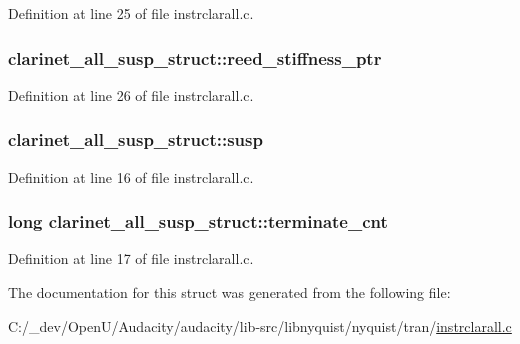 Definition at line 25 of file instrclarall.\+c.

\subsubsection[{\texorpdfstring{reed\+\_\+stiffness\+\_\+ptr}{reed_stiffness_ptr}}]{ clarinet\+\_\+all\+\_\+susp\+\_\+struct\+::reed\+\_\+stiffness\+\_\+ptr}\hypertarget{structclarinet__all__susp__struct_a1ef4f42fbce5563453dbb23e99cbe515}{}\label{structclarinet__all__susp__struct_a1ef4f42fbce5563453dbb23e99cbe515}


Definition at line 26 of file instrclarall.\+c.

\subsubsection[{\texorpdfstring{susp}{susp}}]{ clarinet\+\_\+all\+\_\+susp\+\_\+struct\+::susp}\hypertarget{structclarinet__all__susp__struct_a19306915022f42e71d0c30b49f91cd84}{}\label{structclarinet__all__susp__struct_a19306915022f42e71d0c30b49f91cd84}


Definition at line 16 of file instrclarall.\+c.

\subsubsection[{\texorpdfstring{terminate\+\_\+cnt}{terminate_cnt}}]{\setlength{\rightskip}{0pt plus 5cm}long clarinet\+\_\+all\+\_\+susp\+\_\+struct\+::terminate\+\_\+cnt}\hypertarget{structclarinet__all__susp__struct_a2a86eb694162fff564faee4e32dd2b58}{}\label{structclarinet__all__susp__struct_a2a86eb694162fff564faee4e32dd2b58}


Definition at line 17 of file instrclarall.\+c.



The documentation for this struct was generated from the following file\+:\begin{DoxyCompactItemize}
\item 
C\+:/\+\_\+dev/\+Open\+U/\+Audacity/audacity/lib-\/src/libnyquist/nyquist/tran/\hyperlink{instrclarall_8c}{instrclarall.\+c}\end{DoxyCompactItemize}
